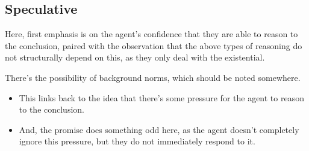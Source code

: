\documentclass[10pt]{article}
\begin{document}
\subsection{Speculative}
\label{sec:speculative}

\begin{note}
  Here, first emphasis is on the agent's confidence that they are able to reason to the conclusion, paired with the observation that the above types of reasoning do not structurally depend on this, as they only deal with the existential.
\end{note}

\begin{note}
  There's the possibility of background norms, which should be noted somewhere.
  \begin{itemize}
  \item This links back to the idea that there's some pressure for the agent to reason to the conclusion.
  \item And, the promise does something odd here, as the agent doesn't completely ignore this pressure, but they do not immediately respond to it.
  \end{itemize}
\end{note}
\end{document}
